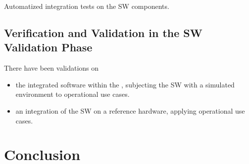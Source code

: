 \documentclass{template/openetcs_article}
\begin{document}
Automatized integration tests on the SW components. 

\subsection{Verification and Validation in the SW Validation Phase}
\label{sec:vnv-7}

There have been validations on
\begin{itemize}
\item the integrated software within the , subjecting the SW with a simulated environment to
  operational use cases.
\item an integration of the SW on a reference hardware, applying
  operational use cases.  
\end{itemize}

\section{Conclusion}
\label{sec:conclusion}









\end{document}
